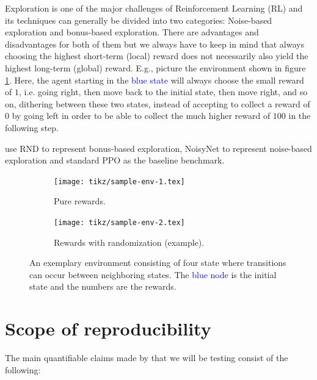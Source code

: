 \documentclass[10pt]{article} %
\begin{document}
\noindent Exploration is one of the major challenges of Reinforcement Learning (RL) and its techniques can generally be divided into two categories: Noise-based exploration and bonus-based exploration. There are advantages and disadvantages for both of them but we always have to keep in mind that always choosing the highest short-term (local) reward does not necessarily also yield the highest long-term (global) reward. E.g., picture the environment shown in figure \ref{fig:sample-env-1}. Here, the agent starting in the \textcolor{blue}{blue state} will always choose the small reward of $1$, i.e. going right, then move back to the initial state, then move right, and so on, dithering between these two states, instead of accepting to collect a reward of $0$ by going left in order to be able to collect the much higher reward of $100$ in the following step.

\noindent \cite{rle-paper} use RND to represent bonus-based exploration, NoisyNet to represent noise-based exploration and standard PPO as the baseline benchmark.

\begin{figure}[h!]
  \centering
  \begin{subfigure}[b]{0.45\textwidth}
    \centering
    \texttt{[image: tikz/sample-env-1.tex]}
    \caption{Pure rewards.}
    \label{fig:sample-env-1}
  \end{subfigure}
  \hfill
  \begin{subfigure}[b]{0.45\textwidth}
    \centering
    \texttt{[image: tikz/sample-env-2.tex]}
    \caption{Rewards with randomization (example).}
    \label{fig:sample-env-2}
  \end{subfigure}
  
  \caption{An exemplary environment consisting of four state where transitions can occur between neighboring states. The \textcolor{blue}{blue node} is the initial state and the numbers are the rewards.}
  \label{fig:sample-env}
\end{figure}

\newpage
\section{Scope of reproducibility}
\label{sec:claims}

\noindent The main quantifiable claims made by \cite{rle-paper} that we will be testing consist of the following:
\end{document}

